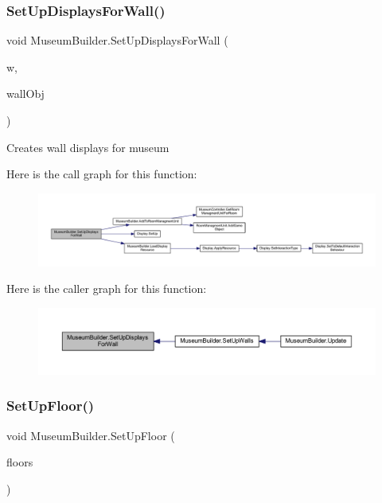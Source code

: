 \subsubsection{\texorpdfstring{Set\+Up\+Displays\+For\+Wall()}{SetUpDisplaysForWall()}}
{\footnotesize\ttfamily void Museum\+Builder.\+Set\+Up\+Displays\+For\+Wall (\begin{DoxyParamCaption}\item[{\mbox{\hyperlink{class_wall}{Wall}}}]{w,  }\item[{Game\+Object}]{wall\+Obj }\end{DoxyParamCaption})\hspace{0.3cm}{\ttfamily [private]}}



Creates wall displays for museum 

Here is the call graph for this function\+:
\nopagebreak
\begin{figure}[H]
\begin{center}
\leavevmode
\includegraphics[width=350pt]{class_museum_builder_adbfb12c00a855fe0f816bc18a51a72e5_cgraph}
\end{center}
\end{figure}
Here is the caller graph for this function\+:
\nopagebreak
\begin{figure}[H]
\begin{center}
\leavevmode
\includegraphics[width=350pt]{class_museum_builder_adbfb12c00a855fe0f816bc18a51a72e5_icgraph}
\end{center}
\end{figure}
\mbox{\label{class_museum_builder_a7a68d64f1f418c4cdf43afc48ffa07b1}} 
\subsubsection{\texorpdfstring{Set\+Up\+Floor()}{SetUpFloor()}}
{\footnotesize\ttfamily void Museum\+Builder.\+Set\+Up\+Floor (\begin{DoxyParamCaption}\item[{List$<$ Game\+Object $>$}]{floors }\end{DoxyParamCaption})\hspace{0.3cm}{\ttfamily [private]}}





